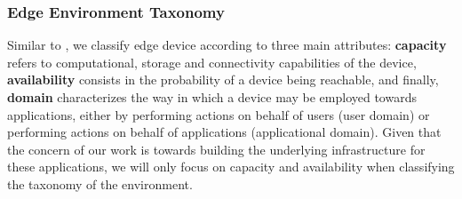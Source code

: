 \subsubsection{Edge Environment Taxonomy} \label{subsec:edge_taxonomy}

Similar to \cite{Leitao2018}, we classify edge device according to three main attributes: \textbf{capacity} refers to computational, storage and connectivity capabilities of the device,  \textbf{availability} consists in the probability of a device being reachable, and finally, \textbf{domain} characterizes the way in which a device may be employed towards applications, either by performing actions on behalf of users (user domain) or performing actions on behalf of applications (applicational domain). Given that the concern of our work is towards building the underlying infrastructure for these applications, we will only focus on capacity and availability when classifying the taxonomy of the environment. 

\begin{table}[!htb]
    \caption{Taxonomy of the edge environment}
    \begin{minipage}{.45\linewidth}
        \centering
    \end{minipage} %
    \begin{minipage}{.45\linewidth}
        \centering
    \end{minipage} 
    \label{tab:taxonomy_edge}
\end{table}

